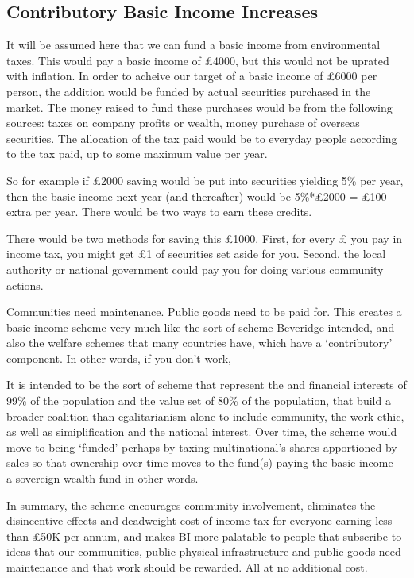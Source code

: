 \documentclass[]{tufte-handout}
\begin{document}
\hypertarget{contributory-basic-income-increases}{%
\subsection{Contributory Basic Income
Increases}\label{contributory-basic-income-increases}}

It will be assumed here that we can fund a basic income from
environmental taxes. This would pay a basic income of £4000, but this
would not be uprated with inflation. In order to acheive our target of a
basic income of £6000 per person, the addition would be funded by actual
securities purchased in the market. The money raised to fund these
purchases would be from the following sources: taxes on company profits
or wealth, money purchase of overseas securities. The allocation of the
tax paid would be to everyday people according to the tax paid, up to
some maximum value per year.

So for example if £2000 saving would be put into securities yielding 5\%
per year, then the basic income next year (and thereafter) would be
5\%*£2000 = £100 extra per year. There would be two ways to earn these
credits.

There would be two methods for saving this £1000. First, for every £ you
pay in income tax, you might get £1 of securities set aside for you.
Second, the local authority or national government could pay you for
doing various community actions.

Communities need maintenance. Public goods need to be paid for. This
creates a basic income scheme very much like the sort of scheme
Beveridge intended, and also the welfare schemes that many countries
have, which have a `contributory' component. In other words, if you
don't work,

It is intended to be the sort of scheme that represent the and financial
interests of 99\% of the population and the value set of 80\% of the
population, that build a broader coalition than egalitarianism alone to
include community, the work ethic, as well as simiplification and the
national interest. Over time, the scheme would move to being `funded'
perhaps by taxing multinational's shares apportioned by sales so that
ownership over time moves to the fund(s) paying the basic income - a
sovereign wealth fund in other words.

In summary, the scheme encourages community involvement, eliminates the
disincentive effects and deadweight cost of income tax for everyone
earning less than £50K per annum, and makes BI more palatable to people
that subscribe to ideas that our communities, public physical
infrastructure and public goods need maintenance and that work should be
rewarded. All at no additional cost.
\end{document}
